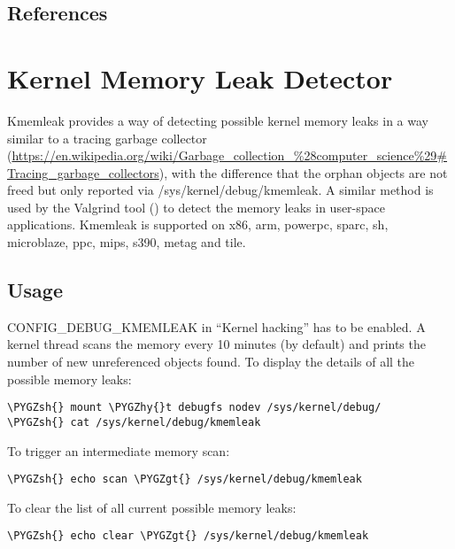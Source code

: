 \documentclass[a4paper,8pt,english]{sphinxmanual}
\def\PYGZgt{\char`\>}
\def\PYGZsh{\char`\#}
\def\PYGZhy{\char`\-}
\begin{document}
\section{References}
\label{dev-tools/ubsan:references}

\chapter{Kernel Memory Leak Detector}
\label{dev-tools/kmemleak::doc}\label{dev-tools/kmemleak:id2}\label{dev-tools/kmemleak:kernel-memory-leak-detector}
Kmemleak provides a way of detecting possible kernel memory leaks in a
way similar to a tracing garbage collector
(\href{https://en.wikipedia.org/wiki/Garbage\_collection\_\%28computer\_science\%29\#Tracing\_garbage\_collectors}{https://en.wikipedia.org/wiki/Garbage\_collection\_\%28computer\_science\%29\#Tracing\_garbage\_collectors}),
with the difference that the orphan objects are not freed but only
reported via /sys/kernel/debug/kmemleak. A similar method is used by the
Valgrind tool () to detect the memory leaks in
user-space applications.
Kmemleak is supported on x86, arm, powerpc, sparc, sh, microblaze, ppc, mips, s390, metag and tile.


\section{Usage}
\label{dev-tools/kmemleak:usage}
CONFIG\_DEBUG\_KMEMLEAK in ``Kernel hacking'' has to be enabled. A kernel
thread scans the memory every 10 minutes (by default) and prints the
number of new unreferenced objects found. To display the details of all
the possible memory leaks:

\begin{Verbatim}[commandchars=\\\{\}]
\PYGZsh{} mount \PYGZhy{}t debugfs nodev /sys/kernel/debug/
\PYGZsh{} cat /sys/kernel/debug/kmemleak
\end{Verbatim}

To trigger an intermediate memory scan:

\begin{Verbatim}[commandchars=\\\{\}]
\PYGZsh{} echo scan \PYGZgt{} /sys/kernel/debug/kmemleak
\end{Verbatim}

To clear the list of all current possible memory leaks:

\begin{Verbatim}[commandchars=\\\{\}]
\PYGZsh{} echo clear \PYGZgt{} /sys/kernel/debug/kmemleak
\end{Verbatim}
\end{document}
